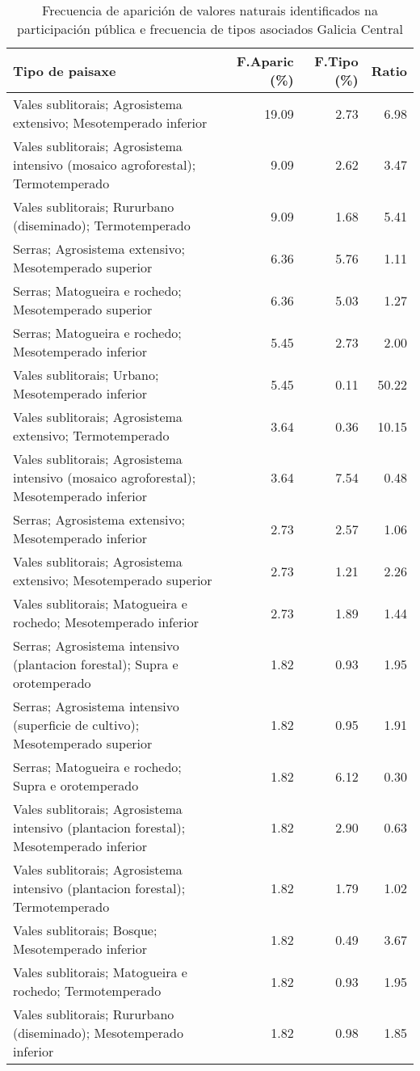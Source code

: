 \begin{table}[p]
\centering
\caption{Frecuencia de aparición de valores naturais identificados na participación pública e frecuencia de tipos asociados Galicia Central} 
\label{vsixotnat7}
\begin{tabular}{lrrr}
  \hline
Tipo de paisaxe & F.Aparic (\%) & F.Tipo (\%) & Ratio \\ 
  \hline
Vales sublitorais; Agrosistema extensivo; Mesotemperado inferior & 19.09 & 2.73 & 6.98 \\ 
  Vales sublitorais; Agrosistema intensivo (mosaico agroforestal); Termotemperado & 9.09 & 2.62 & 3.47 \\ 
  Vales sublitorais; Rururbano (diseminado); Termotemperado & 9.09 & 1.68 & 5.41 \\ 
  Serras; Agrosistema extensivo; Mesotemperado superior & 6.36 & 5.76 & 1.11 \\ 
  Serras; Matogueira e rochedo; Mesotemperado superior & 6.36 & 5.03 & 1.27 \\ 
  Serras; Matogueira e rochedo; Mesotemperado inferior & 5.45 & 2.73 & 2.00 \\ 
  Vales sublitorais; Urbano; Mesotemperado inferior & 5.45 & 0.11 & 50.22 \\ 
  Vales sublitorais; Agrosistema extensivo; Termotemperado & 3.64 & 0.36 & 10.15 \\ 
  Vales sublitorais; Agrosistema intensivo (mosaico agroforestal); Mesotemperado inferior & 3.64 & 7.54 & 0.48 \\ 
  Serras; Agrosistema extensivo; Mesotemperado inferior & 2.73 & 2.57 & 1.06 \\ 
  Vales sublitorais; Agrosistema extensivo; Mesotemperado superior & 2.73 & 1.21 & 2.26 \\ 
  Vales sublitorais; Matogueira e rochedo; Mesotemperado inferior & 2.73 & 1.89 & 1.44 \\ 
  Serras; Agrosistema intensivo (plantacion forestal); Supra e orotemperado & 1.82 & 0.93 & 1.95 \\ 
  Serras; Agrosistema intensivo (superficie de cultivo); Mesotemperado superior & 1.82 & 0.95 & 1.91 \\ 
  Serras; Matogueira e rochedo; Supra e orotemperado & 1.82 & 6.12 & 0.30 \\ 
  Vales sublitorais; Agrosistema intensivo (plantacion forestal); Mesotemperado inferior & 1.82 & 2.90 & 0.63 \\ 
  Vales sublitorais; Agrosistema intensivo (plantacion forestal); Termotemperado & 1.82 & 1.79 & 1.02 \\ 
  Vales sublitorais; Bosque; Mesotemperado inferior & 1.82 & 0.49 & 3.67 \\ 
  Vales sublitorais; Matogueira e rochedo; Termotemperado & 1.82 & 0.93 & 1.95 \\ 
  Vales sublitorais; Rururbano (diseminado); Mesotemperado inferior & 1.82 & 0.98 & 1.85 \\ 
   \hline
\end{tabular}
\end{table}
